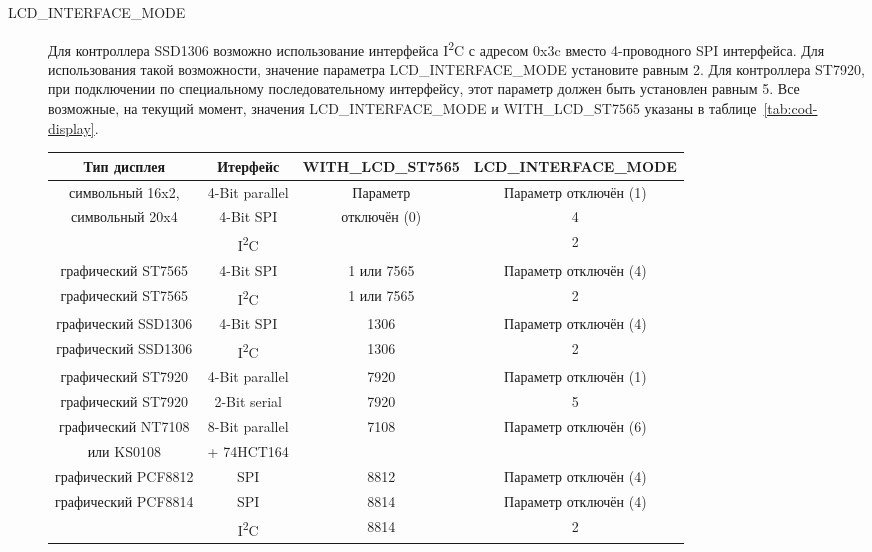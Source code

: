\begin{description}
 \item[LCD\_INTERFACE\_MODE] Для контроллера SSD1306 возможно использование интерфейса I\textsuperscript{2}C с адресом 0x3c
вместо 4-проводного SPI интерфейса. Для использования такой возможности, значение параметра 
LCD\_INTERFACE\_MODE установите равным 2.
Для контроллера ST7920, при подключении по специальному последовательному интерфейсу, этот параметр должен быть установлен равным 5.
Все возможные, на текущий момент, значения LCD\_INTERFACE\_MODE и WITH\_LCD\_ST7565 указаны в таблице~\ref{tab:cod-display}.

\begin{table}[H]
  \begin{center}
    \begin{tabular}{| c | c | c | c|}
    \hline
  Тип дисплея         &  Итерфейс        & WITH\_LCD\_ST7565 & LCD\_INTERFACE\_MODE \\
    \hline
    \hline
  символьный 16x2,    & 4-Bit parallel   & Параметр        &  Параметр отключён (1) \\
  символьный 20x4     & 4-Bit SPI        & отключён (0)    &    4  \\
                     & I\textsuperscript{2}C &            &   2 \\
    \hline
  графический ST7565  & 4-Bit SPI        & 1 или 7565      &  Параметр отключён (4) \\
    \hline
  графический ST7565  & I\textsuperscript{2}C & 1 или 7565 &   2 \\
    \hline
  графический SSD1306 & 4-Bit SPI        & 1306            &  Параметр отключён (4) \\
    \hline
  графический SSD1306 & I\textsuperscript{2}C & 1306       &   2 \\
    \hline
  графический ST7920  & 4-Bit parallel   & 7920            &  Параметр отключён (1) \\
    \hline
  графический ST7920  & 2-Bit serial     & 7920            &   5 \\
    \hline
  графический NT7108  & 8-Bit parallel   & 7108            &  Параметр отключён (6) \\
      или KS0108      &    + 74HCT164    &                 &     \\
    \hline
  графический PCF8812 & SPI              &   8812          &  Параметр отключён (4) \\
    \hline
  графический PCF8814 & SPI              &   8814          &  Параметр отключён (4) \\
                    & I\textsuperscript{2}C & 8814         &   2 \\

\end{tabular}
\end{center}
\end{table}
\end{description}

